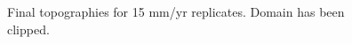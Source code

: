 \documentclass[a4paper]{article}
\begin{document}
\begin{appendices}
\begin{figure}[!ht]
	\caption{Final topographies for 15 mm/yr replicates. Domain has been clipped.}
	\label{fig:015topo}
\end{figure}


\end{appendices}
\end{document}
